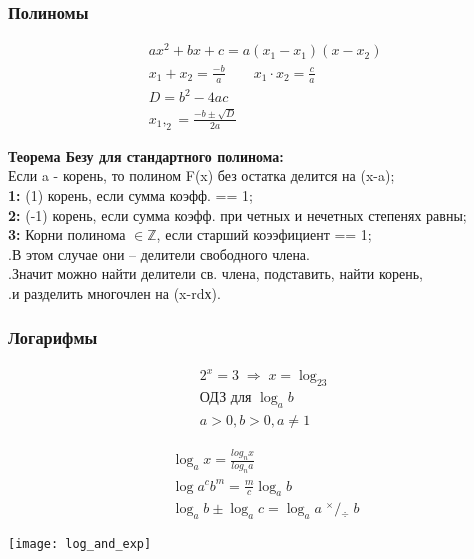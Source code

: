 \documentclass[10pt,a4paper]{scrartcl}
\begin{document}
	\subsubsection*{Полиномы}
	\begin{minipage}{0.3\linewidth}
		\begin{align*}
		& ax^2+bx+c = a(x_1 - x_1)(x-x_2) \\
		& x_1 + x_2 = \frac {-b}{a} \qquad x_1 \cdot x_2 = \frac {c}{a} \\[6pt]
		& D = b^2 -4ac \\
		& x_1,_2 = \frac{-b\pm\sqrt{D}}{2a}
		\end{align*}
	\end{minipage}
	\hfill
	\begin{minipage}{0.7\linewidth}

		\textbf{Теорема Безу для стандартного полинома:}\\
		Если a - корень, то полином F(x) без остатка делится на (x-a); \\
		\textbf{1: } (1) корень, если сумма коэфф. == 1; \\
		\textbf{2: } (-1) корень, если сумма коэфф. при четных и нечетных степенях равны; \\
		\textbf{3: } Корни полинома $\in\mathbb {Z}$, если старший коээфициент == 1; \\
					.\qquad В этом случае они -- делители свободного члена. \\
					.\qquad Значит можно найти делители св. члена, подставить, найти корень,\\
					.\qquad и разделить многочлен на (x-rdх).
	\end{minipage}

	\subsubsection*{Логарифмы}
	\begin{minipage}{0.25\linewidth}\noindent 
		\begin{align*}
		& 2^x = 3 \; \Rightarrow \;x = \log_23 \\
		& \text{ОДЗ для }\log_ab \\
		& a>0, b>0, a \neq 1
		\end{align*}
	\end{minipage}
	\hfill
	\begin{minipage}{0.25\linewidth}\noindent 
	\begin{align*}
		& \log_ax = \frac{log_nx}{log_na} \\
		& \log{a^c}b^m = \frac{m}{c} \log_ab \\
		& \log_ab \pm \log_ac = \log_a{a \; ^{\times} \!\! / \!\! _{\div} \; b}
		\end{align*}
	\end{minipage}
	\begin{minipage}{0.5\linewidth}\noindent
		\texttt{[image: log\_and\_exp]}
	\end{minipage}
	
\end{document}
